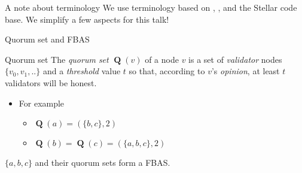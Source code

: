 \documentclass{beamer}
\DeclareMathOperator{\Q}{\mathbf{Q}}
\newcommand{\redalert}[1]{\textcolor{hured}{#1}}
\begin{document}

\begin{frame}{A note about terminology}
We use terminology based on \cite{lokhava2019stellar_payments}, \cite{mazieres2015stellar},
\cite{lachowski2019complexity} and the Stellar code base.
\vfill
\redalert{We simplify a few aspects for this talk!}
\end{frame}


\begin{frame}{Quorum set and FBAS}

  \begin{block}{Quorum set}
    The \emph{quorum set} $\Q(v)$ of a node $v$ is a set of \emph{validator} nodes $\{v_0, v_1, ..\}$
    and a \emph{threshold} value $t$ so that,
    according to $v$'s \emph{opinion},
    at least $t$ validators will be honest.
  \end{block}

  \begin{itemize}
    \item For example\begin{itemize}
      \item $\Q(a) = (\{b, c\}, 2)$
      \item $\Q(b) = \Q(c) = (\{a, b, c\}, 2)$
      \end{itemize}
  \end{itemize}

  \vfill
  $\{a,b,c\}$ and their quorum sets form a \alert{FBAS}.
\end{frame}
\end{document}
